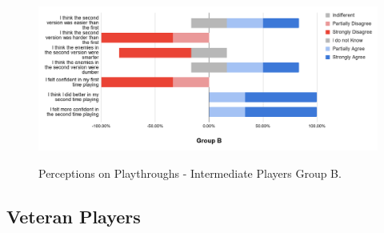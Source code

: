 \begin{figure}[!ht]
    \begin{center}
    \caption{Perceptions on Playthroughs - Intermediate Players Group B.}
        \includegraphics[width=36em]{figures/fig-perception-versions-intermediate-players-group-b.png}
        \label{fig:perception-playthrough-intermediate-players-group-b}
    \end{center}
\end{figure}


\subsection{Veteran Players}



